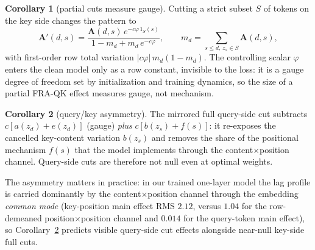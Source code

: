 \documentclass{article}
\newcommand{\Ab}{\boldsymbol{A}}
\theoremstyle{definition}
\newtheorem{corollary}{Corollary}
\begin{document}
\begin{corollary}[partial cuts measure gauge]\label{cor:partial}
Cutting a strict subset $S$ of tokens on the key side changes the pattern to
\begin{equation}\label{partialcut}
\Ab'(d,s) = \frac{\Ab(d,s)\, e^{-c\varphi\, 1_S(s)}}{1 - m_d + m_d\,
e^{-c\varphi}}, \qquad m_d = \textstyle\sum_{s \le d,\, z_s \in S} \Ab(d,s),
\end{equation}
with first-order row total variation $|c\varphi|\, m_d(1-m_d)$. The
controlling scalar $\varphi$ enters the clean model only as a row constant,
invisible to the loss: it is a gauge degree of freedom set by initialization
and training dynamics, so the size of a partial FRA-QK effect measures
gauge, not mechanism.
\end{corollary}

\begin{corollary}[query/key asymmetry]\label{cor:asym}
The mirrored full query-side cut subtracts $c[a(z_d) + e(z_d)]$ (gauge)
\emph{plus} $c[b(z_s) + f(s)]$: it re-exposes the cancelled key-content
variation $b(z_s)$ and removes the share of the positional mechanism $f(s)$
that the model implements through the content$\times$position channel.
Query-side cuts are therefore not null even at optimal weights.
\end{corollary}

The asymmetry matters in practice: in our trained one-layer model the lag
profile is carried dominantly by the content$\times$position channel through
the embedding \emph{common mode} (key-position main effect RMS $2.12$,
versus $1.04$ for the row-demeaned position$\times$position channel and
$0.014$ for the query-token main effect), so
Corollary~\ref{cor:asym} predicts visible query-side cut effects alongside
near-null key-side full cuts.
\end{document}
